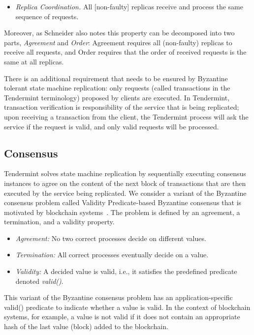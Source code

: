 \begin{itemize}
	\item \emph{Replica Coordination.} All [non-faulty] replicas receive
	and process the same sequence of requests.
\end{itemize}

Moreover, as Schneider also notes this property can be decomposed into
two parts, \emph{Agreement} and \emph{Order}: Agreement
requires all (non-faulty) replicas to receive all
requests, and Order requires that the order of received requests
is the same at all replicas.

There is an additional requirement that needs to be ensured by Byzantine tolerant state machine replication:
only requests (called transactions in the Tendermint terminology) proposed by clients are executed. In Tendermint, transaction verification is responsibility of the service that is 
being replicated; upon receiving a transaction from the client, the Tendermint process will ask the service if the request is valid, and only valid 
requests will be processed. 

 \subsection{Consensus}
 \label{sec:consensus}

Tendermint solves state machine replication by sequentially executing consensus instances to agree on the content of the next block of transactions that are then executed by the service being replicated. We consider a variant of the Byzantine consensus problem called Validity Predicate-based Byzantine consensus that is motivated by blockchain
systems~\cite{GLR17:red-belly-bc}. The problem is defined by an agreement, a termination, and a validity
property.

 \begin{itemize}
 \item \emph{Agreement:} No two correct processes decide on different values.
 \item \emph{Termination:} All correct processes eventually decide on a value.
 \item \emph{Validity:} A decided value is valid, i.e., it satisfies the predefined predicate denoted \emph{valid()}.
 \end{itemize}

This variant of the Byzantine consensus problem has an application-specific valid() predicate to indicate whether a value is valid. In the context of blockchain systems, for example, a value is not valid if it does not contain an appropriate hash of the last value (block) added to the blockchain.
